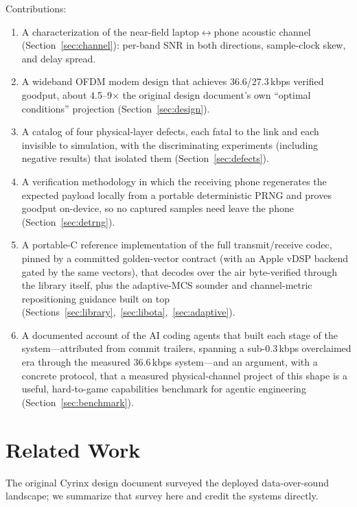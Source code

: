 \documentclass[11pt]{article}
\begin{document}
Contributions:
\begin{enumerate}
  \item A characterization of the near-field laptop$\leftrightarrow$phone
        acoustic channel (Section~\ref{sec:channel}): per-band SNR in both
        directions, sample-clock skew, and delay spread.
  \item A wideband OFDM modem design that achieves 36.6/27.3\,kbps verified
        goodput, about 4.5--9$\times$ the original design document's own
        ``optimal conditions'' projection (Section~\ref{sec:design}).
  \item A catalog of four physical-layer defects, each fatal to the link and
        each invisible to simulation, with the discriminating experiments
        (including negative results) that isolated them
        (Section~\ref{sec:defects}).
  \item A verification methodology in which the receiving phone regenerates
        the expected payload locally from a portable deterministic PRNG and
        proves goodput on-device, so no captured samples need leave the phone
        (Section~\ref{sec:detrng}).
  \item A portable-C reference implementation of the full transmit/receive
        codec, pinned by a committed golden-vector contract (with an Apple vDSP
        backend gated by the same vectors), that decodes over the air byte-verified
        through the library itself, plus the adaptive-MCS sounder and
        channel-metric repositioning guidance built on top
        (Sections~\ref{sec:library},~\ref{sec:libota},~\ref{sec:adaptive}).
  \item A documented account of the AI coding agents that built each stage
        of the system---attributed from commit trailers, spanning a
        sub-0.3\,kbps overclaimed era through the measured 36.6\,kbps
        system---and an argument, with a concrete protocol, that a measured
        physical-channel project of this shape is a useful, hard-to-game
        capabilities benchmark for agentic engineering
        (Section~\ref{sec:benchmark}).
\end{enumerate}

\section{Related Work}
\label{sec:related}

The original Cyrinx design document \cite{prd} surveyed the deployed
data-over-sound landscape; we summarize that survey here and credit the
systems directly.
\end{document}
